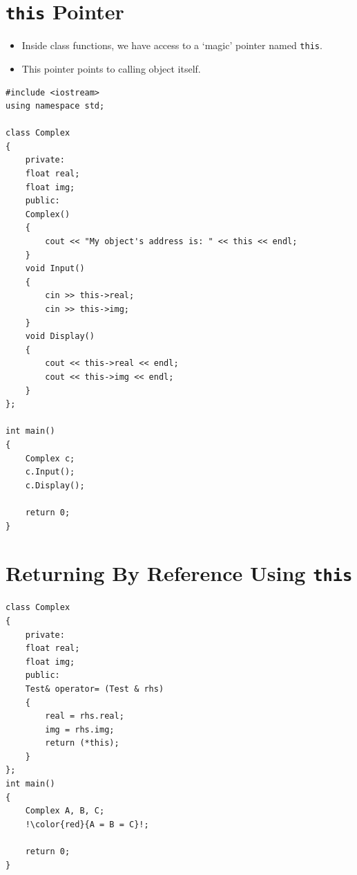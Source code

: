 \documentclass[12pt,a4paper]{article}
\begin{document}
\section{\texttt{this} Pointer}
\begin{itemize}
\item Inside class functions, we have access to a `magic' pointer named \verb|this|.
\item This pointer points to calling object itself.
\end{itemize}
\begin{lstlisting}[caption={\texttt{this} pointer}]
#include <iostream>
using namespace std;

class Complex
{
	private:
	float real;
	float img;
	public:
	Complex()
	{
		cout << "My object's address is: " << this << endl;
	}
	void Input()
	{
		cin >> this->real;
		cin >> this->img;
	}
	void Display()
	{
		cout << this->real << endl;
		cout << this->img << endl;
	}
};

int main()
{
	Complex c;
	c.Input();
	c.Display();

	return 0;
}
\end{lstlisting}
\section{Returning By Reference Using \texttt{this}}
\begin{lstlisting}[caption={Returning by reference using \texttt{this} pointer},escapechar=!]
class Complex
{
	private:
	float real;
	float img;
	public:
	Test& operator= (Test & rhs)
	{
		real = rhs.real;
		img = rhs.img;
		return (*this);
	}
};
int main()
{
	Complex A, B, C;
	!\color{red}{A = B = C}!;

	return 0;
}
\end{lstlisting}
\end{document}
